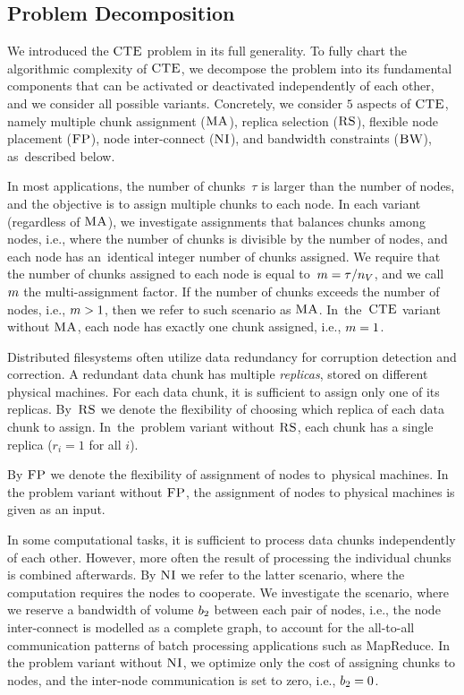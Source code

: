 \subsection{Problem Decomposition}

We introduced the $\textsc{CTE}$ problem in its full generality.
To fully chart the algorithmic complexity of $\textsc{CTE}$, we decompose the problem into its fundamental components that can be activated or deactivated independently of each other, and we consider all possible variants.
Concretely, we consider $5$ aspects of $\textsc{CTE}$, namely multiple chunk assignment ($\textsc{MA}$),
replica selection ($\textsc{RS}$), flexible node placement ($\textsc{FP}$), node inter-connect ($\textsc{NI}$),
and bandwidth constraints ($\textsc{BW}$), as~described below.

In most applications, the number of chunks~$\tau$ is larger than the number of nodes, and the objective is to assign multiple chunks to each node.
In each variant (regardless of $\textsc{MA}$), we investigate assignments that balances chunks among nodes, i.e., where the number of chunks is divisible by the number of nodes, and each node has an~identical integer number of chunks assigned.
We require that the number of chunks assigned to each node is equal to~$m = \tau / n_V$, and we call $m$ the multi-assignment factor.
If the number of chunks exceeds the number of nodes, i.e., $m > 1$, then we refer to such scenario as $\textsc{MA}$.
In~the~$\textsc{CTE}$ variant without $\textsc{MA}$, each node has exactly one chunk assigned, i.e., $m = 1$.

Distributed filesystems often utilize data redundancy for corruption detection and correction.
A redundant data chunk has multiple \emph{replicas}, stored on different physical machines.
For each data chunk, it is sufficient to assign only one of its replicas.
By~$\textsc{RS}$ we denote the flexibility of choosing which replica of each data chunk to assign.
In~the~problem variant without $\textsc{RS}$, each chunk has a single replica ($r_i = 1$ for all $i$).

By $\textsc{FP}$ we denote the flexibility of assignment of nodes to~physical machines.
In the problem variant without $\textsc{FP}$, the assignment of nodes to physical machines is given as an input.

In some computational tasks, it is sufficient to process data chunks independently of each other.
However, more often the result of processing the individual chunks is combined afterwards.
By $\textsc{NI}$ we refer to the latter scenario, where the computation requires the nodes to cooperate.
We investigate the scenario, where we reserve a bandwidth of volume $b_2$ between each pair of nodes, i.e., the node inter-connect is modelled as a complete graph, to account for the all-to-all communication patterns of batch processing applications such as MapReduce.
In the problem variant without $\textsc{NI}$, we optimize only the cost of assigning chunks to nodes, and the inter-node communication is set to zero, i.e., $b_2 = 0$.


